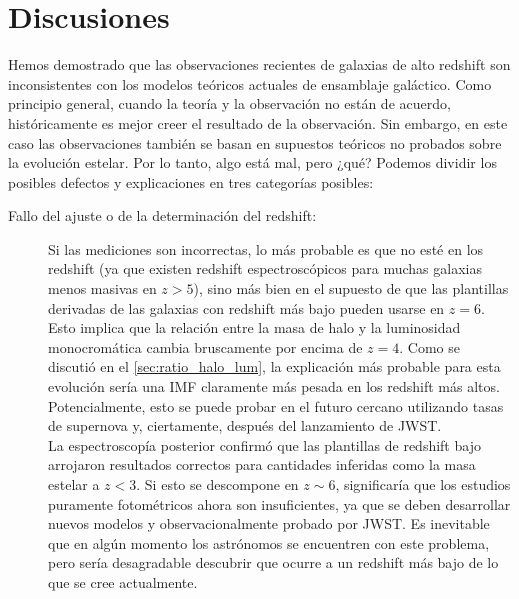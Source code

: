 \documentclass{article}
\begin{document}
\section{Discusiones}
Hemos demostrado que las observaciones recientes de galaxias de alto redshift son inconsistentes con los modelos teóricos actuales de ensamblaje galáctico. Como principio general, cuando la teoría y la observación no están de acuerdo, históricamente es mejor creer el resultado de la observación. Sin embargo, en este caso las observaciones también se basan en supuestos teóricos no probados sobre la evolución estelar. Por lo tanto, algo está mal, pero ¿qué? Podemos dividir los posibles defectos y explicaciones en tres categorías posibles:
\begin{description}
\item[Fallo del ajuste o de la determinación del redshift:] Si las mediciones son incorrectas, lo más probable es que no esté en los redshift (ya que existen redshift espectroscópicos para muchas galaxias menos masivas en $z> 5$), sino más bien en el supuesto de que las plantillas derivadas de las galaxias con redshift más bajo pueden usarse en $z = 6$. Esto implica que la relación entre la masa de halo y la luminosidad monocromática cambia bruscamente por encima de $z = 4$. Como se discutió en el \cref{sec:ratio_halo_lum}, la explicación más probable para esta evolución sería una IMF claramente más pesada en los redshift más altos. Potencialmente, esto se puede probar en el futuro cercano utilizando tasas de supernova y, ciertamente, después del lanzamiento de JWST.\\

La espectroscopía posterior confirmó que las plantillas de redshift bajo arrojaron resultados correctos para cantidades inferidas como la masa estelar a $z <3$. Si esto se descompone en $z\sim 6$, significaría que los estudios puramente fotométricos ahora son insuficientes, ya que se deben desarrollar nuevos modelos y observacionalmente probado por JWST. Es inevitable que en algún momento los astrónomos se encuentren con este problema, pero sería desagradable descubrir que ocurre a un redshift más bajo de lo que se cree actualmente.


\end{description}
\end{document}
